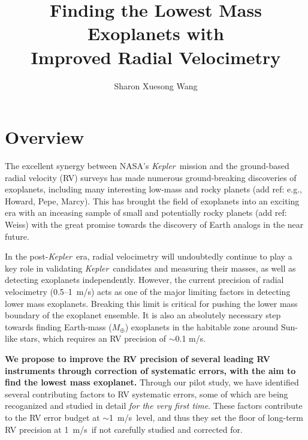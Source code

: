 \documentclass[12pt]{article}
\def\mps{m/s}
\def\mearth{M_{\oplus}}
\def\kepler{{\it Kepler}}
\begin{document}

\title{\vspace{-45pt} \bf \Large Finding the Lowest Mass Exoplanets with
  \\ Improved Radial Velocimetry \vspace{-6pt}}
\author{\normalsize Sharon Xuesong Wang}
\date{}
\maketitle

\vspace{-30pt}
\section{Overview}

The excellent synergy between NASA's \kepler\ mission and the
ground-based radial velocity (RV) surveys has made numerous
ground-breaking discoveries of exoplanets, including many interesting
low-mass and rocky planets (add ref: e.g., Howard, Pepe, Marcy). This
has brought the field of exoplanets into an exciting era with an
inceasing sample of small and potentially rocky planets (add ref:
Weiss) with the great promise towards the discovery of Earth analogs
in the near future.

In the post-\kepler\ era, radial velocimetry will undoubtedly continue
to play a key role in validating \kepler\ candidates and measuring
their masses, as well as detecting exoplanets independently. However,
the current precision of radial velocimetry (0.5--1~\mps) acts as one
of the major limiting factors in detecting lower mass
exoplanets. Breaking this limit is critical for pushing the lower mass
boundary of the exoplanet ensemble. It is also an absolutely
necessary step towards finding Earth-mass ($\mearth$) exoplanets in
the habitable zone around Sun-like stars, which requires an RV
precision of $\sim$0.1 \mps.

\textbf{We propose to improve the RV precision of several leading RV
  instruments through correction of systematic errors, with the aim to
  find the lowest mass exoplanet.} Through our pilot study, we have
identified several contributing factors to RV systematic errors,
some of which are being recoganized and studied in detail \textit{for the
very first time}. These factors contribute to the RV error budget at
$\sim$1~\mps\ level, and thus they set the floor of long-term RV
precision at 1~\mps\ if not carefully studied and corrected for.
\end{document}
